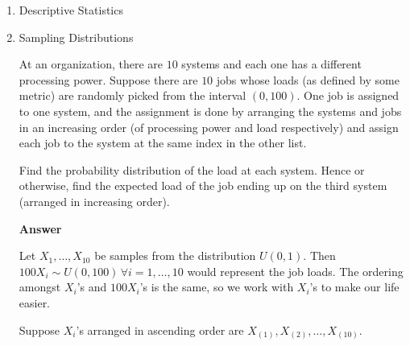 \documentclass[12pt, oneside]{article}
\begin{document}
\begin{enumerate}
{    %

    
    
    
        
}


\item	Descriptive Statistics


\item	{
  Sampling Distributions

  At an organization, there are \(10\) systems and each one has a different processing
  power. Suppose there are \(10\) jobs whose loads (as defined by some metric) are
  randomly picked from the interval \((0, 100)\). One job is assigned to one system,
  and the assignment is done by arranging the systems and jobs in an increasing order
  (of processing power and load respectively) and assign each job to the system at 
  the same index in the other list.

  Find the probability distribution of the load at each system. Hence or otherwise, find
  the expected load of the job ending up on the third system (arranged in increasing order).

  \textbf{Answer}

  Let \(X_1, \ldots, X_{10}\) be samples from the distribution \(U(0, 1)\). Then
  \(100X_i \sim U(0, 100) \,\forall i = 1,\ldots,10 \) would represent the job loads.
  The ordering amongst \(X_i\)'s and \(100X_i\)'s is the same, so we work with \(X_i\)'s
  to make our life easier.

  Suppose \(X_i\)'s arranged in ascending order are \(X_{(1)}, X_{(2)}, \ldots, X_{(10)}\).

}
\end{enumerate}
\end{document}
